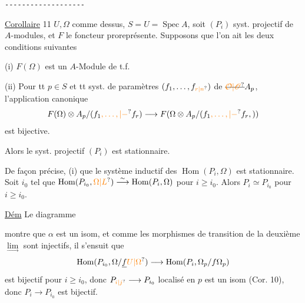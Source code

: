 \begin{center}\texttt{-{}-{}-{}-{}-{}-{}-{}-{}-{}-{}-{}-{}-{}-{}-{}-{}-{}-{}-}\end{center}

\uline{Corollaire} 11  $U,\Omega$ comme dessus,   $S=U=\operatorname{Spec}A$, soit $(P_i)$   syst. projectif de $A$-modules, et $F$ le foncteur  proreprésente. Supposons que l'on ait les deux conditions suivantes

(i) $F(\Omega)$ est un $A$-Module de t.f.

(ii) Pour tt $p\in S$ et tt syst. de paramètres $(f_1,\ldots,f_{\unsure{r|n}})$ de $\deleted{\unsure{\mathcal O|\mathscr O}}A_p$, l'application canonique
\[
 F(\Omega)\otimes A_p/(f_1\unsure{,\ldots,|-}f_r)
 \longrightarrow F(\Omega\otimes A_p/(f_1\unsure{,\ldots,|-}f_r,))
\]
est bijective.

Alors le syst. projectif $(P_i)$ est stationnaire.

De façon précise, (i)   que le système inductif des $\operatorname{Hom}(P_i,\Omega)$ est stationnaire. Soit  $i_0$ tel que $\operatorname{Hom}(P_{i_0},\unsure{\Omega|L})\overset{\sim}{\longrightarrow}\operatorname{Hom}(P_i,\Omega)$ pour $i\geq i_0$. Alors $P_i\simeq P_{i_0}$ pour $i\geq i_0$.

\uline{Dém} Le diagramme

montre que $\alpha$ est un isom, et comme les morphismes de transition de la deuxième $\underset{\longrightarrow}{\lim}$ sont injectifs, il s'ensuit que
\[
 \operatorname{Hom}(P_{i_0},\Omega/\underline f\unsure{U|\Omega})\longrightarrow
 \operatorname{Hom}(P_i,\Omega_p/f\Omega_p)
\]
est bijectif pour $i\geq i_0$, donc $P_{\unsure{i|j}}\longrightarrow P_{i_0}$ localisé en $p$ est un isom (Cor. 10), donc $P_i\longrightarrow P_{i_0}$ est bijectif.

